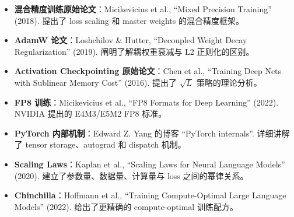 \begin{itemize}
    \item \textbf{混合精度训练原始论文}：Micikevicius et al., ``Mixed Precision Training'' (2018). 提出了 loss scaling 和 master weights 的混合精度框架。
    \item \textbf{AdamW 论文}：Loshchilov \& Hutter, ``Decoupled Weight Decay Regularization'' (2019). 阐明了解耦权重衰减与 L2 正则化的区别。
    \item \textbf{Activation Checkpointing 原始论文}：Chen et al., ``Training Deep Nets with Sublinear Memory Cost'' (2016). 提出了 $\sqrt{L}$ 策略的理论分析。
    \item \textbf{FP8 训练}：Micikevicius et al., ``FP8 Formats for Deep Learning'' (2022). NVIDIA 提出的 E4M3/E5M2 FP8 标准。
    \item \textbf{PyTorch 内部机制}：Edward Z. Yang 的博客 ``PyTorch internals''. 详细讲解了 tensor storage、autograd 和 dispatch 机制。
    \item \textbf{Scaling Laws}：Kaplan et al., ``Scaling Laws for Neural Language Models'' (2020). 建立了参数量、数据量、计算量与 loss 之间的幂律关系。
    \item \textbf{Chinchilla}：Hoffmann et al., ``Training Compute-Optimal Large Language Models'' (2022). 给出了更精确的 compute-optimal 训练配方。
\end{itemize}


